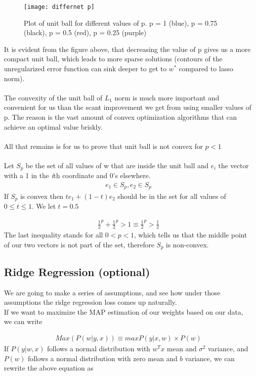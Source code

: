 \documentclass[12pt,onecolumn,a4paper]{article}
\begin{document}
\begin{figure}[H]
	\centering
	\texttt{[image: differnet p]}
	\caption{Plot of unit ball for different values of p. p = 1 (blue), p = 0.75 (black), p = 0.5 (red), p = 0.25 (purple)}
\end{figure}

It is evident from the figure above, that decreasing the value of p gives us a more compact unit ball, which leads to more sparse solutions (contours of the unregularized error function can sink deeper to get to $w^*$ compared to lasso norm).
\\ \\
The convexity of the unit ball of $L_1$ norm is much more important and convenient for us than the scant improvement we get from using smaller values of p. The reason is the vast amount of convex optimization algorithms that can achieve an optimal value briskly.
\\ \\
All that remains is for us to prove that unit ball is not convex for $p < 1$
\\ \\
Let $S_p$ be the set of all values of w that are inside the unit ball and $e_i$ the vector with a 1 in the \emph{i}th coordinate and 0's elsewhere.
\begin{align*}
	e_1 \in S_p, e_2 \in S_p
\end{align*}
If $S_p$ is convex then $t e_1 + (1-t)e_2$ should be in the set for all values of $0 \leq t \leq 1$. We let $t = 0.5$

\begin{align*}
	\frac{1}{2}^p + \frac{1}{2}^p > 1 \equiv \frac{1}{2}^p > \frac{1}{2} 
\end{align*}
The last inequality stands for all $0 < p < 1$, which tells us that the middle point of our two vectors is not part of the set, therefore $S_p$ is non-convex.

\subsection{Ridge Regression (optional)}
We are going to make a series of assumptions, and see how under those assumptions the ridge regression loss comes up naturally.
\\
If we want to maximize the MAP estimation of our weights based on our data, we can write

\begin{align*}
	Max(P(w|y,x)) \equiv max P(y|x,w) \times P(w)
\end{align*}
If $P(y|w,x)$ follows a normal distribution with $w^Tx$ mean and $\sigma^2$ variance, and $P(w)$ follows a normal distribution with zero mean and $b$ variance, we can rewrite the above equation as 
\end{document}

